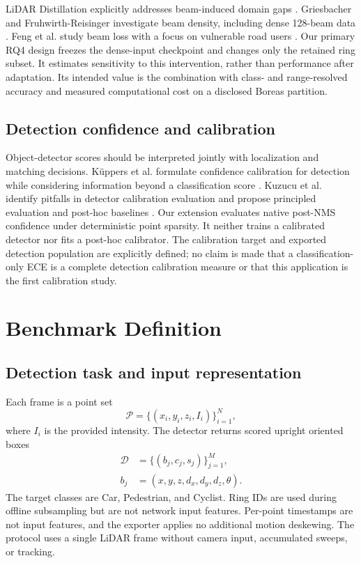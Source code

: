 \documentclass[10pt,twocolumn]{article}
\begin{document}
LiDAR Distillation explicitly addresses beam-induced domain gaps \cite{wei2022lidardistillation}. Griesbacher and Fruhwirth-Reisinger investigate beam density, including dense 128-beam data \cite{griesbacher2025beamdensity}. Feng et al. study beam loss with a focus on vulnerable road users \cite{feng2026beamloss}. Our primary RQ4 design freezes the dense-input checkpoint and changes only the retained ring subset. It estimates sensitivity to this intervention, rather than performance after adaptation. Its intended value is the combination with class- and range-resolved accuracy and measured computational cost on a disclosed Boreas partition.

\subsection{Detection confidence and calibration}
Object-detector scores should be interpreted jointly with localization and matching decisions. K\"uppers et al. formulate confidence calibration for detection while considering information beyond a classification score \cite{kuppers2020calibration}. Kuzucu et al. identify pitfalls in detector calibration evaluation and propose principled evaluation and post-hoc baselines \cite{kuzucu2024calibration}. Our extension evaluates native post-NMS confidence under deterministic point sparsity. It neither trains a calibrated detector nor fits a post-hoc calibrator. The calibration target and exported detection population are explicitly defined; no claim is made that a classification-only ECE is a complete detection calibration measure or that this application is the first calibration study.

\section{Benchmark Definition}
\label{sec:benchmark}
\subsection{Detection task and input representation}
Each frame is a point set
\begin{equation}
\mathcal{P}=\{(x_i,y_i,z_i,I_i)\}_{i=1}^{N},
\end{equation}
where $I_i$ is the provided intensity. The detector returns scored upright oriented boxes
\begin{equation}
\begin{aligned}\mathcal{D}&=\{(b_j,c_j,s_j)\}_{j=1}^{M},\\ b_j&=(x,y,z,d_x,d_y,d_z,\theta).\end{aligned}
\end{equation}
The target classes are Car, Pedestrian, and Cyclist. Ring IDs are used during offline subsampling but are not network input features. Per-point timestamps are not input features, and the exporter applies no additional motion deskewing. The protocol uses a single LiDAR frame without camera input, accumulated sweeps, or tracking.
\end{document}
